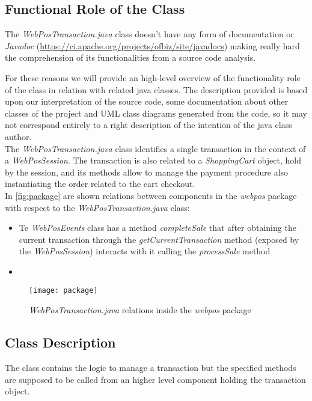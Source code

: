 \subsection{Functional Role of the Class}
The \emph{WebPosTransaction.java} class doesn't have any form of documentation or \emph{Javadoc} (\url{https://ci.apache.org/projects/ofbiz/site/javadocs}) making really hard the comprehension of its functionalities from a source code analysis.

For these reasons we will provide an high-level overview of the functionality role of the class in relation with related java classes. The description provided is based upon our interpretation of the source code, some documentation about other classes of the project and UML class diagrams generated from the code, so it may not correspond entirely to a right description of the intention of the java class author.\\

The \emph{WebPosTransaction.java} class identifies a single transaction in the context of a \emph{WebPosSession}. The transaction is also related to a \emph{ShoppingCart} object, hold by the session, and its methods allow to manage the payment procedure also instantiating the order related to the cart checkout. \\

In \autoref{fig:package} are shown relations between components in the \emph{webpos} package with respect to the \emph{WebPosTransaction.java} class:
\begin{itemize}
	\item Te \emph{WebPosEvents} class has a method \emph{completeSale} that after obtaining the current transaction through the \emph{getCurrentTransaction} method (exposed by the \emph{WebPosSession}) interacts with it calling the \emph{processSale} method
	\item 
\end{itemize}

\begin{figure}[h]
			\centering
			\texttt{[image: package]}
			\caption{
				\label{fig:package} 
				\emph{WebPosTransaction.java} relations inside the \emph{webpos} package
			}
		\end{figure}

\subsection{Class Description}
The class contains the logic to manage a transaction but the specified methods are supposed to be called from an higher level component holding the transaction object.

